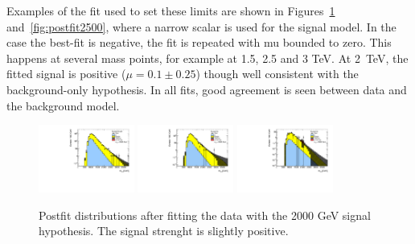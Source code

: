 Examples of the fit used to set these limits are shown in Figures~\ref{fig:postfit2000} and~\ref{fig:postfit2500}, where a narrow scalar is used for the signal model. In the case the best-fit is negative, the fit is repeated with mu bounded to zero. This happens at several mass points, for example at 1.5, 2.5 and 3 TeV. At 2~TeV, the fitted signal is positive ($\mu=0.1\pm0.25$) though well consistent with the background-only hypothesis. In all fits, good agreement is seen between data and the background model.

\begin{figure}[htbp!]
\begin{center}
\includegraphics[width=0.28\textwidth,angle=-90]{figures/boosted/results/postfitplot_s_2000_b2b.pdf} 
\includegraphics[width=0.28\textwidth,angle=-90]{figures/boosted/results/postfitplot_s_2000_b3b.pdf} 
\includegraphics[width=0.28\textwidth,angle=-90]{figures/boosted/results/postfitplot_s_2000_b4b.pdf} 
\caption{Postfit distributions after fitting the data with the 2000 GeV signal hypothesis. The signal strenght is slightly positive.}
\label{fig:postfit2000}
\end{center}
\end{figure}

